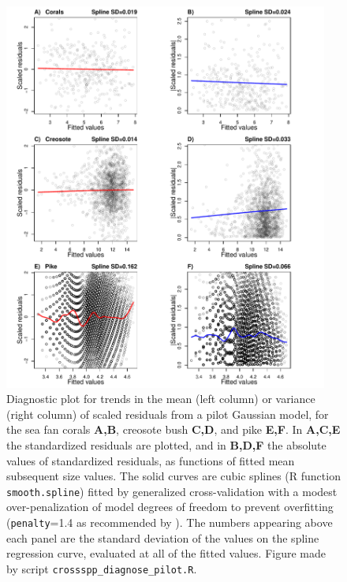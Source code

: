 \documentclass[12pt]{article}
\begin{document}
\begin{spacing}{1.35}
	\begin{figure}[tbp]
		\centering
		\includegraphics[width=0.95\textwidth]{figures/diagnose_pilot_supplement.pdf}
		\caption{Diagnostic plot for trends in the mean (left column) or variance (right column) of scaled residuals from a pilot Gaussian model, for the sea fan corals \textbf{A,B}, creosote bush \textbf{C,D}, and pike \textbf{E,F}. 
			In \textbf{A,C,E} the standardized residuals are plotted, and in \textbf{B,D,F} the absolute values of
			standardized residuals, as functions of fitted mean subsequent size values. The solid curves are cubic splines (R function \texttt{smooth.spline}) fitted by generalized cross-validation with a modest over-penalization of model degrees of freedom to prevent overfitting (\texttt{penalty}=1.4 as recommended by \citet{gu-2013}). The numbers appearing above each panel are the standard deviation of the values on the spline regression curve, evaluated at all of the 
			fitted values. Figure made by script \texttt{crossspp\_diagnose\_pilot.R}.}
		\label{fig:diagnose_pilot_supplement}
	\end{figure}
	

\end{spacing}
\end{document}

